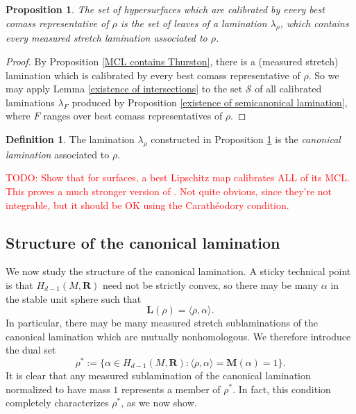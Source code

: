 \documentclass[reqno,11pt]{amsart}
\newcommand{\RR}{\mathbf{R}}
\newcommand{\Mass}{\mathbf M}
\newcommand{\Comass}{\mathbf L}
\newcommand{\dfn}[1]{\emph{#1}\index{#1}}
\newtheorem{proposition}[theorem]{Proposition}
\theoremstyle{definition}
\newtheorem{definition}[theorem]{Definition}
\numberwithin{equation}{section}
\newcommand\todo[1]{\textcolor{red}{TODO: #1}}
\begin{document}
\begin{proposition}\label{existence of canonical lamination}
The set of hypersurfaces which are calibrated by every best comass representative of $\rho$ is the set of leaves of a lamination $\lambda_\rho$, which contains every measured stretch lamination associated to $\rho$.
\end{proposition}
\begin{proof}
By Proposition \ref{MCL contains Thurston}, there is a (measured stretch) lamination which is calibrated by every best comass representative of $\rho$.
So we may apply Lemma \ref{existence of intersections} to the set $\mathscr S$ of all calibrated laminations $\lambda_F$ produced by Proposition \ref{existence of semicanonical lamination}, where $F$ ranges over best comass representatives of $\rho$.
\end{proof}

\begin{definition}
The lamination $\lambda_\rho$ constructed in Proposition \ref{existence of canonical lamination} is the \dfn{canonical lamination} associated to $\rho$.
\end{definition}

\todo{Show that for surfaces, a best Lipschitz map calibrates ALL of its MCL. This proves a much stronger version of \cite[Theorem 5.2]{daskalopoulos2020transverse}. Not quite obvious, since they're not integrable, but it should be OK using the Carath\'eodory condition.}

\subsection{Structure of the canonical lamination}\label{canonical structure}
We now study the structure of the canonical lamination.
A sticky technical point is that $H_{d - 1}(M, \RR)$ need not be strictly convex, so there may be many $\alpha$ in the stable unit sphere such that 
\begin{equation}\label{flats duality}
\Comass(\rho) = \langle \rho, \alpha\rangle.
\end{equation}
In particular, there may be many measured stretch sublaminations of the canonical lamination which are mutually nonhomologous.
We therefore introduce the dual set 
$$\rho^* := \{\alpha \in H_{d - 1}(M, \RR): \langle \rho, \alpha\rangle = \Mass(\alpha) = 1\}.$$
It is clear that any measured sublamination of the canonical lamination normalized to have mass $1$ represents a member of $\rho^*$.
In fact, this condition completely characterizes $\rho^*$, as we now show.
\end{document}
